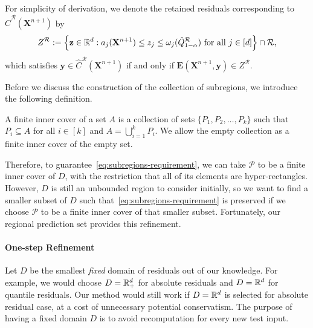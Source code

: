 For simplicity of derivation, we denote the retained residuals corresponding to $\hat C^{\mathcal R}(\mathbf X^{n+1})$ by
\begin{equation}\label{eq:retained-residuals}
Z^{\mathcal R}
:=
\left\{
\mathbf z\in\mathbb{R}^d:
a_j(\mathbf X^{n+1})
\leq z_j\leq\omega_j(\hat Q^{\mathcal R}_{1-\alpha})
\text{ for all }j\in[d]
\right\}
\cap\mathcal R,
\end{equation}
which satisfies
$\mathbf y\in\hat C^{\mathcal R}(\mathbf X^{n+1})$
if and only if
$\mathbf E(\mathbf X^{n+1},\mathbf y)\in Z^{\mathcal R}$.

Before we discuss the construction of the collection of subregions, we introduce the following definition.

\begin{definition}
A finite inner cover of a set $A$ is a collection of sets
$\{P_1,P_2,\ldots,P_k\}$ such that $P_i\subseteq A$ for all $i\in[k]$ and
$A=\bigcup_{i=1}^k P_i$.
We allow the empty collection as a finite inner cover of the empty set.
\end{definition}

Therefore, to guarantee~\eqref{eq:subregions-requirement}, we can take $\mathcal P$ to be a finite inner cover of $D$, with the restriction that all of its elements are hyper-rectangles. However, $D$ is still an unbounded region to consider initially, so we want to find a smaller subset of $D$ such that~\eqref{eq:subregions-requirement} is preserved if we choose $\mathcal P$ to be a finite inner cover of that smaller subset. Fortunately, our regional prediction set provides this refinement.

\paragraph{One-step Refinement} Let $D$ be the smallest \emph{fixed} domain of residuals out of our knowledge. For example, we would choose $D=\mathbb{R}^d_+$ for absolute residuals and $D=\mathbb{R}^d$ for quantile residuals. Our method would still work if $D = \mathbb{R}^d$ is selected for absolute residual case, at a cost of unnecessary potential conservatism. The purpose of having a fixed domain $D$ is to avoid recomputation for every new test input.

